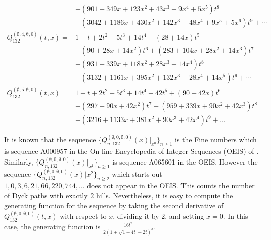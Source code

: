 \documentclass[
final,nomarks
]{dmtcs-episciences}
\newcommand{\Qmm}[1]{Q_{132}^{(#1)}(t,x)}
\newcommand{\Qmmn}[2]{Q_{#2,132}^{(#1)}(x)}
\begin{document}
\begin{align}
&+\left(901+349 x+123 x^2+43 x^3+9 x^4+5 x^5\right) t^8\\
&+\left(3042+1186 x+430 x^2+142 x^3+48 x^4+9 x^5+5 x^6\right) t^9+\cdots 
\\
\Qmm{\emptyset,4,\emptyset,0}=& 1+t+2 t^2+5 t^3+14 t^4+(28+14 x) t^5\nonumber\\\nonumber
&+\left(90+28 x+14 x^2\right) t^6+\left(283+104 x+28 x^2+14 x^3\right) t^7\\\nonumber
&+\left(931+339 x+118 x^2+28
x^3+14 x^4\right) t^8\\
&+\left(3132+1161 x+395 x^2+132 x^3+28 x^4+14 x^5\right) t^9+\cdots 
\\
\Qmm{\emptyset,5,\emptyset,0}=&1+t+2 t^2+5 t^3+14 t^4+42 t^5+(90+42 x) t^6\nonumber\\\nonumber
&+\left(297+90 x+42 x^2\right) t^7+\left(959+339 x+90 x^2+42 x^3\right) t^8\\
&+\left(3216+1133
x+381 x^2+90 x^3+42 x^4\right) t^9+\ldots
\end{align}


It is known that the sequence \begin{math}\{\Qmmn{\emptyset,0,\emptyset,0}{n}\big\vert_{x^0}\}_{n \geq 1}\end{math} 
is the Fine 
numbers which is sequence A000957 in the On-line Encyclopedia of Integer Sequences (OEIS) of \cite{oeis}.
Similarly, \begin{math}\{\Qmmn{\emptyset,0,\emptyset,0}{n}\big\vert_{x^1}\}_{n \geq 1}\end{math} is sequence 
A065601 in the OEIS.  However the sequence 
\begin{math}\{\Qmmn{\emptyset,0,\emptyset,0}{n}\big\vert{x^2}\}_{n \geq 2}\end{math} which starts out \\
\begin{math}1,0,3,6,21,66,220,744, \ldots\end{math} does not appear in the OEIS. This counts the number of 
Dyck paths with exactly \begin{math}2\end{math} hills. Nevertheless, it is easy to compute the generating 
function for the sequence by taking the second derivative of \begin{math}\Qmm{\emptyset,0,\emptyset,0}\end{math} 
with respect to \begin{math}x\end{math}, dividing it by \begin{math}2\end{math}, and setting \begin{math}x=0\end{math}.  In this case, the 
generating function is \begin{math}\frac{16t^2}{2(1+\sqrt{1-4t}+2t)^3}\end{math}. 
\end{document}
